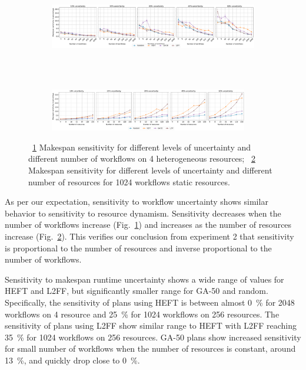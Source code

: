 \begin{figure}[ht!]
    \centering
    \begin{subfigure}[b]{0.85\textwidth}
        \includegraphics[width=.95\textwidth]{figures/campaign/InaccurStHeteroCampaigns_4StHeteroResourcesSens.pdf}
        \caption{}
        \label{fig:InaccurStHeteroCampaigns_4StHeteroResourcesSens}
    \end{subfigure}\\
    ~ 
    \begin{subfigure}[b]{0.85\textwidth}
        \includegraphics[width=0.95\textwidth]{figures/campaign/InaccurStHeteroResources_StHeteroCampaignsSens.pdf}
        \caption{}
        \label{fig:InaccurStHeteroResources_StHeteroCampaignsSens}
    \end{subfigure}
    \caption{~\ref{fig:InaccurStHeteroCampaigns_4StHeteroResourcesSens} Makespan sensitivity for different levels of uncertainty and different number of workflows on 4 heterogeneous resources;
    ~\ref{fig:InaccurStHeteroResources_StHeteroCampaignsSens} Makespan sensitivity for different levels of uncertainty and different number of resources for 1024 workflows static resources.}
    \label{fig:inaccur_st}
\end{figure}

As per our expectation, sensitivity to workflow uncertainty shows similar behavior to sensitivity to resource dynamism.
Sensitivity decreases when the number of workflows increase (Fig.~\ref{fig:InaccurStHeteroCampaigns_4StHeteroResourcesSens}) and increases as the number of resources increase (Fig.~\ref{fig:InaccurStHeteroResources_StHeteroCampaignsSens}).
This verifies our conclusion from experiment 2 that sensitivity is proportional to the number of resources and inverse proportional to the number of workflows.

Sensitivity to makespan runtime uncertainty shows a wide range of values for HEFT and L2FF, but significantly smaller range for GA-50 and random.
Specifically, the sensitivity of plans using HEFT is between almost 0~\% for 2048 workflows on 4 resource and 25~\% for 1024 workflows on 256 resources.
The sensitivity of plans using L2FF show similar range to HEFT with L2FF reaching 35~\% for 1024 workflows on 256 resources.
GA-50 plans show increased sensitivity for small number of workflows when the number of resources is constant, around 13~\%, and quickly drop close to 0~\%.

